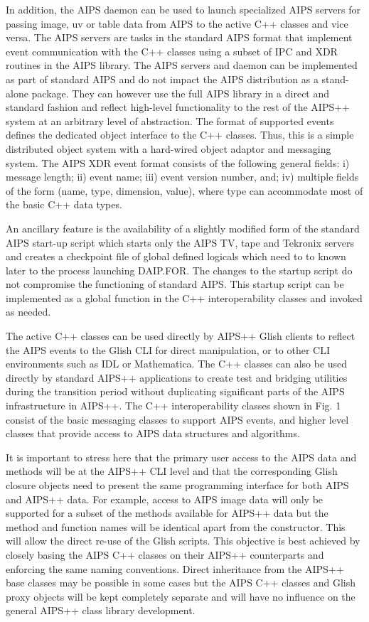 In addition, the AIPS daemon can be used to launch specialized AIPS
servers for passing image, uv or table data from AIPS to the active
C++ classes and vice versa. The AIPS servers are tasks in the standard
AIPS format that implement event communication with the C++ classes
using a subset of IPC and XDR routines in the AIPS library.  The AIPS
servers and daemon can be implemented as part of standard AIPS and do
not impact the AIPS distribution as a stand-alone package. They can
however use the full AIPS library in a direct and standard fashion and
reflect high-level functionality to the rest of the AIPS++ system at
an arbitrary level of abstraction. The format of supported events
defines the dedicated object interface to the C++ classes. Thus, this
is a simple distributed object system with a hard-wired object adaptor
and messaging system.  The AIPS XDR event format consists of the
following general fields: i) message length; ii) event name; iii)
event version number, and; iv) multiple fields of the form (name,
type, dimension, value), where type can accommodate most of the
basic C++ data types.

 An ancillary feature is the availability of a slightly modified form
of the standard AIPS start-up script which starts only the AIPS TV,
tape and Tekronix servers and creates a checkpoint file of global
defined logicals which need to to known later to the process launching
DAIP.FOR. The changes to the startup script do not compromise the
functioning of standard AIPS. This startup script can be implemented
as a global function in the C++ interoperability classes and invoked as
needed.

 The active C++ classes can be used directly by AIPS++ Glish clients
to reflect the AIPS events to the Glish CLI for direct manipulation,
or to other CLI environments such as IDL or Mathematica. The C++
classes can also be used directly by standard AIPS++ applications to
create test and bridging utilities during the transition period
without duplicating significant parts of the AIPS infrastructure in
AIPS++. The C++ interoperability classes shown in Fig. 1 consist of
the basic messaging classes to support AIPS events, and higher level
classes that provide access to AIPS data structures and algorithms.

 It is important to stress here that the primary user access to the
AIPS data and methods will be at the AIPS++ CLI level and that the
corresponding Glish closure objects need to present the same
programming interface for both AIPS and AIPS++ data. For example,
access to AIPS image data will only be supported for a subset of the
methods available for AIPS++ data but the method and function names
will be identical apart from the constructor. This will allow the
direct re-use of the Glish scripts. This objective is best achieved by
closely basing the AIPS C++ classes on their AIPS++ counterparts and
enforcing the same naming conventions. Direct inheritance from the
AIPS++ base classes may be possible in some cases but the AIPS C++
classes and Glish proxy objects will be kept completely separate and
will have no influence on the general AIPS++ class library
development.

